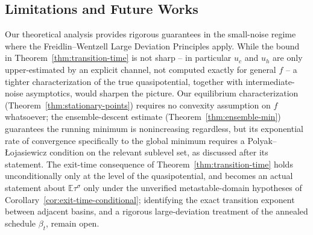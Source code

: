 \documentclass{article}
\theoremstyle{plain}
\theoremstyle{definition}
\theoremstyle{remark}
\newcommand{\E}{\mathbb{E}}
\begin{document}
\subsection{Limitations and Future Works}
\label{sec:limitations}
Our theoretical analysis provides rigorous guarantees in the small-noise regime where the Freidlin--Wentzell Large Deviation Principles apply. While the bound in Theorem~\ref{thm:transition-time} is not sharp -- in particular $u_c$ and $u_h$ are only upper-estimated by an explicit channel, not computed exactly for general $f$ -- a tighter characterization of the true quasipotential, together with intermediate-noise asymptotics, would sharpen the picture. Our equilibrium characterization (Theorem~\ref{thm:stationary-points}) requires no convexity assumption on $f$ whatsoever; the ensemble-descent estimate (Theorem~\ref{thm:ensemble-min}) guarantees the running minimum is nonincreasing regardless, but its exponential rate of convergence specifically to the global minimum requires a Polyak–\L{}ojasiewicz condition on the relevant sublevel set, as discussed after its statement. The exit-time consequence of Theorem~\ref{thm:transition-time} holds unconditionally only at the level of the quasipotential, and becomes an actual statement about $\E\tau^\sigma$ only under the unverified metastable-domain hypotheses of Corollary~\ref{cor:exit-time-conditional}; identifying the exact transition exponent between adjacent basins, and a rigorous large-deviation treatment of the annealed schedule $\beta_t$, remain open.
\end{document}
